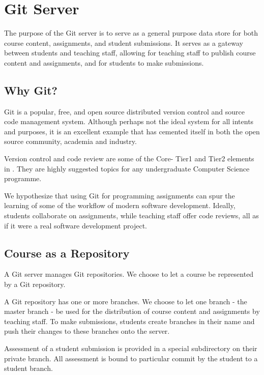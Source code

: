 
\section{Git Server}

The purpose of the Git server is to serve as a general purpose data store for
both course content, assignments, and student submissions. It serves as a
gateway between students and teaching staff, allowing for teaching staff to
publish course content and assignments, and for students to make submissions.

\subsection{Why Git?}

Git is a popular\cite{ohloh-2014}, free, and open source distributed version
control and source code management system\cite{git-2014}. Although perhaps not
the ideal system for all intents and purposes, it is an excellent example that
has cemented itself in both the open source community, academia and
industry\cite{gitprojects-2014}.

Version control and code review are some of the Core- Tier1 and Tier2 elements
in \cite{cs-curricula-2013}. They are highly suggested topics for any
undergraduate Computer Science programme.

We hypothesize that using Git for programming assignments can spur the learning
of some of the workflow of modern software development. Ideally, students
collaborate on assignments, while teaching staff offer code reviews, all as if
it were a real software development project.

\subsection{Course as a Repository}

A Git server manages Git repositories. We choose to let a course be represented
by a Git repository.

A Git repository has one or more branches. We choose to let one branch - the
master branch - be used for the distribution of course content and assignments
by teaching staff. To make submissions, students create branches in their name
and push their changes to these branches onto the server.

Assessment of a student submission is provided in a special subdirectory on
their private branch. All assessment is bound to particular commit by the
student to a student branch.

